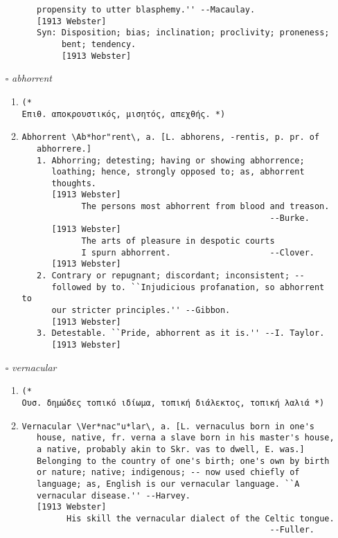 \documentclass{article}
\begin{document}
\begin{itemize}
\begin{enumerate}
{\begin{lstlisting}
   propensity to utter blasphemy.'' --Macaulay.
   [1913 Webster]
   Syn: Disposition; bias; inclination; proclivity; proneness;
        bent; tendency.
        [1913 Webster]
\end{lstlisting}}
\end{enumerate}
\item[$\square$] \emph{ abhorrent }
\begin{enumerate}
\item{
\begin{lstlisting}
(* 
Επιθ. αποκρουστικός, μισητός, απεχθής. *)
\end{lstlisting}}
\item{
\begin{lstlisting}
Abhorrent \Ab*hor"rent\, a. [L. abhorens, -rentis, p. pr. of
   abhorrere.]
   1. Abhorring; detesting; having or showing abhorrence;
      loathing; hence, strongly opposed to; as, abhorrent
      thoughts.
      [1913 Webster]
            The persons most abhorrent from blood and treason.
                                                  --Burke.
      [1913 Webster]
            The arts of pleasure in despotic courts
            I spurn abhorrent.                    --Clover.
      [1913 Webster]
   2. Contrary or repugnant; discordant; inconsistent; --
      followed by to. ``Injudicious profanation, so abhorrent to
      our stricter principles.'' --Gibbon.
      [1913 Webster]
   3. Detestable. ``Pride, abhorrent as it is.'' --I. Taylor.
      [1913 Webster]
\end{lstlisting}}
\end{enumerate}
\item[$\square$] \emph{ vernacular }
\begin{enumerate}
\item{
\begin{lstlisting}
(* 
Ουσ. δημώδες τοπικό ιδίωμα, τοπική διάλεκτος, τοπική λαλιά *)
\end{lstlisting}}
\item{
\begin{lstlisting}
Vernacular \Ver*nac"u*lar\, a. [L. vernaculus born in one's
   house, native, fr. verna a slave born in his master's house,
   a native, probably akin to Skr. vas to dwell, E. was.]
   Belonging to the country of one's birth; one's own by birth
   or nature; native; indigenous; -- now used chiefly of
   language; as, English is our vernacular language. ``A
   vernacular disease.'' --Harvey.
   [1913 Webster]
         His skill the vernacular dialect of the Celtic tongue.
                                                  --Fuller.

\end{lstlisting}}
\end{enumerate}
\end{itemize}
\end{document}

